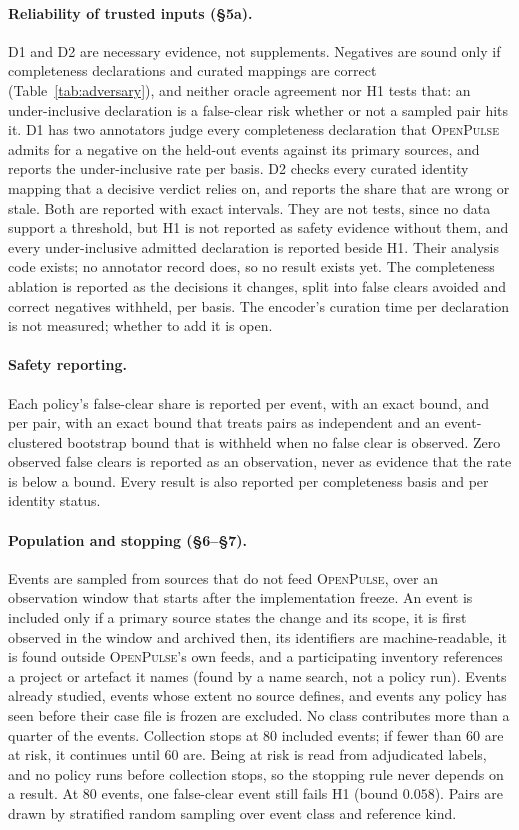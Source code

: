 \documentclass[11pt,a4paper]{article}
\newcommand{\op}{\textsc{OpenPulse}}
\begin{document}
\paragraph{Reliability of trusted inputs (\S5a).} D1 and D2 are
necessary evidence, not supplements. Negatives are sound only if
completeness declarations and curated mappings are correct
(Table~\ref{tab:adversary}), and neither oracle agreement nor H1 tests
that: an under-inclusive declaration is a false-clear risk whether or
not a sampled pair hits it. D1 has two annotators judge every
completeness declaration that \op{} admits for a negative on the
held-out events against its primary sources, and reports the
under-inclusive rate per basis. D2 checks every curated identity
mapping that a decisive verdict relies on, and reports the share that
are wrong or stale. Both are reported with exact intervals. They are
not tests, since no data support a threshold, but H1 is not reported
as safety evidence without them, and every under-inclusive admitted
declaration is reported beside H1. Their analysis code exists; no
annotator record does, so no result exists yet. The completeness
ablation is reported as the decisions it changes, split into false
clears avoided and correct negatives withheld, per basis. The
encoder's curation time per declaration is not measured; whether to
add it is open.

\paragraph{Safety reporting.} Each policy's false-clear share is
reported per event, with an exact bound, and per pair, with an exact
bound that treats pairs as independent and an event-clustered bootstrap
bound that is withheld when no false clear is observed. Zero observed
false clears is reported as an observation, never as evidence that the
rate is below a bound. Every result is also reported per completeness
basis and per identity status.

\paragraph{Population and stopping (\S6--\S7).} Events are sampled
from sources that do not feed \op{}, over an observation window that
starts after the implementation freeze. An event is included only if a
primary source states the change and its scope, it is first observed
in the window and archived then, its identifiers are machine-readable,
it is found outside \op{}'s own feeds, and a participating inventory
references a project or artefact it names (found by a name search, not
a policy run). Events already studied, events whose extent no source
defines, and events any policy has seen before their case file is
frozen are excluded. No class contributes more than a quarter of the
events. Collection stops at 80 included events; if fewer than 60 are at
risk, it continues until 60 are. Being at risk is read from adjudicated
labels, and no policy runs before collection stops, so the stopping
rule never depends on a result. At 80 events, one false-clear event
still fails H1 (bound $0.058$). Pairs are drawn by stratified random
sampling over event class and reference kind.
\end{document}
